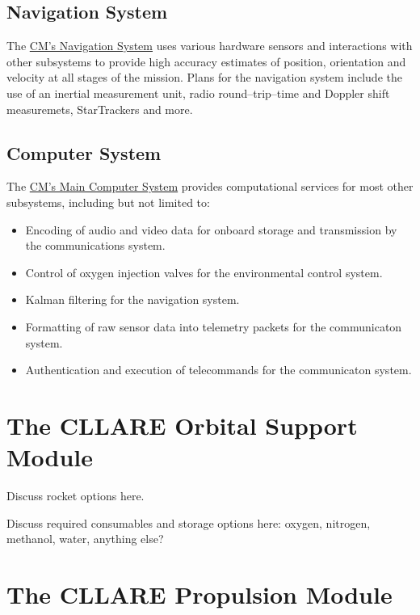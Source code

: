 \documentclass{report}
\begin{document}
\subsection{Navigation System}

The \href{http://cstart.org/wiki/CLLARE_CM_Navigation_System}{CM's Navigation System} uses various hardware sensors and interactions with other subsystems to provide high accuracy estimates of position, orientation and velocity at all stages of the mission.  Plans for the navigation system include the use of an inertial measurement unit, radio round--trip--time and Doppler shift measuremets, StarTrackers and more.

\subsection{Computer System}

The \href{http://cstart.org/wiki/CLLARE_Main_Computer_System}{CM's Main Computer System} provides computational services for most other subsystems, including but not limited to:
\begin{itemize}
\item Encoding of audio and video data for onboard storage and transmission by the communications system.
\item Control of oxygen injection valves for the environmental control system.
\item Kalman filtering for the navigation system.
\item Formatting of raw sensor data into telemetry packets for the communicaton system.
\item Authentication and execution of telecommands for the communicaton system.
\end{itemize}

\section{The CLLARE Orbital Support Module}

Discuss rocket options here.

Discuss required consumables and storage options here: oxygen, nitrogen, methanol, water, anything else?


\section{The CLLARE Propulsion Module}
\end{document}
